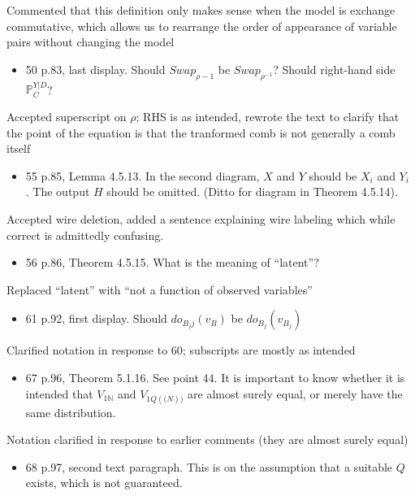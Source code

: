 Commented that this definition only makes sense when the model is exchange commutative, which allows us to rearrange the order of appearance of variable pairs without changing the model


\begin{itemize}
    \item  50 p.83, last display. Should $Swap_{\rho - 1}$ be $Swap_{\rho^{-1}}$? Should right-hand side $\mathbb{P}^{Y|D}_C$?
\end{itemize}


Accepted superscript on $\rho$; RHS is as intended, rewrote the text to clarify that the point of the equation is that the tranformed comb is not generally a comb itself

\begin{itemize}
    \item 55 p.85, Lemma 4.5.13. In the second diagram, $X$ and $Y$ should be $X_i$ and $Y_i$ . The output $H$ should be omitted. (Ditto for diagram in Theorem 4.5.14).
\end{itemize}
 

Accepted wire deletion, added a sentence explaining wire labeling which while correct is admittedly confusing.

\begin{itemize}
    \item 56 p.86, Theorem 4.5.15. What is the meaning of ``latent''?
\end{itemize}
 

Replaced ``latent'' with ``not a function of observed variables''

\begin{itemize}
    \item 61 p.92, first display. Should $do_{B_j j}(v_B )$ be $do_{B_j} (v_{B_j} )$
\end{itemize}

Clarified notation in response to 60; subscripts are mostly as intended

\begin{itemize}
    \item 67 p.96, Theorem 5.1.16. See point 44. It is important to know whether it is intended that $V_{1 \mathbb{N}}$ and $V_{1Q( \mathbb(N) )}$ are almost surely equal, or merely have the same distribution.
\end{itemize}

Notation clarified in response to earlier comments (they are almost surely equal)

\begin{itemize}
    \item 68 p.97, second text paragraph. This is on the assumption that a suitable $Q$ exists, which is not guaranteed.
\end{itemize}
 
